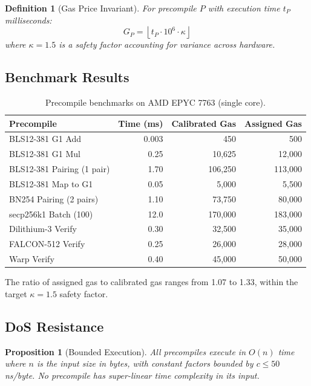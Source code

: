 \documentclass[11pt,a4paper]{article}
\newtheorem{proposition}[theorem]{Proposition}
\newtheorem{definition}{Definition}
\begin{document}
\begin{definition}[Gas Price Invariant]
For precompile $P$ with execution time $t_P$ milliseconds:
\begin{equation}
    G_P = \left\lfloor t_P \cdot 10^6 \cdot \kappa \right\rfloor
\end{equation}
where $\kappa = 1.5$ is a safety factor accounting for variance across hardware.
\end{definition}

\subsection{Benchmark Results}

\begin{table}[H]
\centering
\caption{Precompile benchmarks on AMD EPYC 7763 (single core).}
\label{tab:benchmarks}
\begin{tabular}{lrrr}
\toprule
\textbf{Precompile} & \textbf{Time (ms)} & \textbf{Calibrated Gas} & \textbf{Assigned Gas} \\
\midrule
BLS12-381 G1 Add & 0.003 & 450 & 500 \\
BLS12-381 G1 Mul & 0.25 & 10,625 & 12,000 \\
BLS12-381 Pairing (1 pair) & 1.70 & 106,250 & 113,000 \\
BLS12-381 Map to G1 & 0.05 & 5,000 & 5,500 \\
BN254 Pairing (2 pairs) & 1.10 & 73,750 & 80,000 \\
secp256k1 Batch (100) & 12.0 & 170,000 & 183,000 \\
Dilithium-3 Verify & 0.30 & 32,500 & 35,000 \\
FALCON-512 Verify & 0.25 & 26,000 & 28,000 \\
Warp Verify & 0.40 & 45,000 & 50,000 \\
\bottomrule
\end{tabular}
\end{table}

The ratio of assigned gas to calibrated gas ranges from 1.07 to 1.33, within the target $\kappa = 1.5$ safety factor.

\subsection{DoS Resistance}

\begin{proposition}[Bounded Execution]
All precompiles execute in $O(n)$ time where $n$ is the input size in bytes, with constant factors bounded by $c \leq 50$ ns/byte. No precompile has super-linear time complexity in its input.
\end{proposition}
\end{document}
